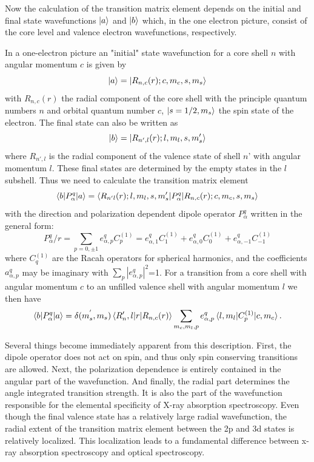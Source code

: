 Now the calculation of the transition matrix element depends on the initial and final state wavefunctions $\ket{a}$ and $\ket{b}$ which, in the one electron picture, consist of the core level and valence electron wavefunctions, respectively.

In a one-electron picture an "initial" state wavefunction for a core shell $n$ with angular momentum $c$ is given by
\begin{equation}
\ket{a}=\ket{R_{n,c}(r);c,m_c,s,m_s}
\end{equation}
with $R_{n,c}(r)$ the radial component of the core shell with the principle quantum numbers $n$ and orbital quantum number $c$, $\ket{s=1/2,m_s}$ the spin state of the electron. The final state can also be written as
\begin{equation}
\ket{b}=\ket{R_{n',l}(r);l,m_l,s,m_s'}
\end{equation}
where $R_{n',l}$ is the radial component of the valence state of shell $n$' with angular momentum $l$. These final  states are determined by the empty states in the $l$ subshell. Thus we need to calculate the transition matrix element
\begin{equation}
\braket{b|P_\alpha^q|a}=\braket{R_{n'l}(r);l,m_l,s,m_s'|P_\alpha^q|R_{n,c}(r);c,m_c,s,m_s}
\end{equation}
with the direction and polarization dependent dipole operator $P_\alpha^q$ written in the general form:
\begin{equation}
P_\alpha^q/r = \sum_{p=0,\pm 1}e_{\alpha,p}^qC_p^{(1)}=e_{\alpha,1}^qC_1^{(1)}+e_{\alpha,0}^qC_0^{(1)}+e_{\alpha,-1}^qC_{-1}^{(1)}
\end{equation}
where $C_q^{(1)}$ are the Racah operators for spherical harmonics, and the coefficients $a_{\alpha,p}^q$ may be imaginary with $\sum_p|e^q_{\alpha,p}|^2$=1. For a transition from a core shell with angular momentum $c$ to an unfilled valence shell with angular momentum $l$ we then have
\begin{equation}
\braket{b|P_\alpha^q|a}=\delta(m_s^{'},m_s)\braket{R_n',l|r|R_{n,c}(r)}\sum_{m_c,m_l,p}e_{\alpha,p}^q\braket{l,m_l|C_p^{(1)}|c,m_c}.
\end{equation}

Several things become immediately apparent from this description. First, the dipole operator does not act on spin, and thus only spin conserving transitions are allowed. Next, the polarization dependence is entirely contained in the angular part of the wavefunction. And finally, the radial part determines the angle integrated transition strength. It is also the part of the wavefunction responsible for the elemental specificity of X-ray absorption spectroscopy. Even though the final valence state has a relatively large radial wavefunction, the radial extent of the transition matrix element between the 2p and 3d states is relatively localized. This localization leads to a fundamental difference between x-ray absorption spectroscopy and optical spectroscopy.

